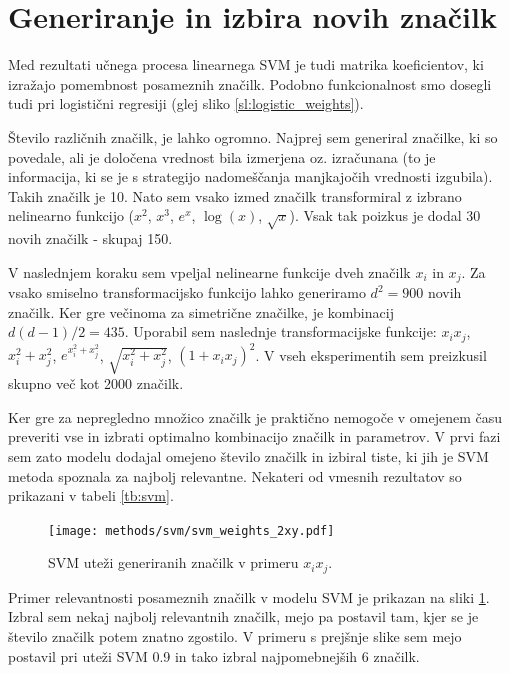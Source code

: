 \documentclass[11pt,a4paper,openany]{book}
\begin{document}
\section{Generiranje in izbira novih značilk}
Med rezultati učnega procesa linearnega SVM je tudi matrika koeficientov, ki izražajo pomembnost posameznih značilk. Podobno funkcionalnost smo dosegli tudi pri logistični regresiji (glej sliko \ref{sl:logistic_weights}).

Število različnih značilk, je lahko ogromno. Najprej sem generiral značilke, ki so povedale, ali je določena vrednost bila izmerjena oz. izračunana (to je informacija, ki se je s strategijo nadomeščanja manjkajočih vrednosti izgubila). Takih značilk je 10. Nato sem vsako izmed značilk transformiral z izbrano nelinearno funkcijo ($x^2$, $x^3$, $e^{x}$, $\log(x)$, $\sqrt{x}$). Vsak tak poizkus je dodal 30 novih značilk - skupaj 150.

V naslednjem koraku sem vpeljal nelinearne funkcije dveh značilk $x_i$ in $x_j$. Za vsako smiselno transformacijsko funkcijo lahko generiramo $d^2 = 900$ novih značilk. Ker gre večinoma za simetrične značilke, je kombinacij $d(d-1)/2 = 435$. Uporabil sem naslednje transformacijske funkcije: $x_ix_j$, $x_i^2 + x_j^2$, $e^{x_i^2 + x_j^2}$, $\sqrt{x_i^2 + x_j^2}$, $(1 + x_ix_j)^2$. V vseh eksperimentih sem preizkusil skupno več kot 2000 značilk.

Ker gre za nepregledno množico značilk je praktično nemogoče v omejenem času preveriti vse in izbrati optimalno kombinacijo značilk in parametrov. V prvi fazi sem zato modelu dodajal omejeno število značilk in izbiral tiste, ki jih je SVM metoda spoznala za najbolj relevantne. Nekateri od vmesnih rezultatov so prikazani v tabeli \ref{tb:svm}.

\begin{figure}[h]
	\centering	
	\texttt{[image: methods/svm/svm\_weights\_2xy.pdf]}
	
	\caption{SVM uteži generiranih značilk v primeru $x_ix_j$.}
	\label{sl:svm_xy_weights}
\end{figure}

Primer relevantnosti posameznih značilk v modelu SVM je prikazan na sliki \ref{sl:svm_xy_weights}. Izbral sem nekaj najbolj relevantnih značilk, mejo pa postavil tam, kjer se je število značilk potem znatno zgostilo. V primeru s prejšnje slike sem mejo postavil pri uteži SVM 0.9 in tako izbral najpomebnejših 6 značilk.
\end{document}
